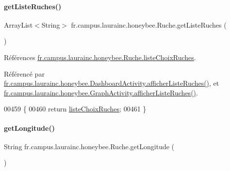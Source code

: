 \paragraph{\texorpdfstring{get\+Liste\+Ruches()}{getListeRuches()}}
{\footnotesize\ttfamily Array\+List$<$String$>$ fr.\+campus.\+laurainc.\+honeybee.\+Ruche.\+get\+Liste\+Ruches (\begin{DoxyParamCaption}{ }\end{DoxyParamCaption})}



Références \hyperlink{classfr_1_1campus_1_1laurainc_1_1honeybee_1_1_ruche_accb6ae9a3a546857525f0e1cdc023250}{fr.\+campus.\+laurainc.\+honeybee.\+Ruche.\+liste\+Choix\+Ruches}.



Référencé par \hyperlink{classfr_1_1campus_1_1laurainc_1_1honeybee_1_1_dashboard_activity_aeb7cdaf69c379e2b070e290130199543}{fr.\+campus.\+laurainc.\+honeybee.\+Dashboard\+Activity.\+afficher\+Liste\+Ruches()}, et \hyperlink{classfr_1_1campus_1_1laurainc_1_1honeybee_1_1_graph_activity_a9e7c089cbecac26d4251fa5310038107}{fr.\+campus.\+laurainc.\+honeybee.\+Graph\+Activity.\+afficher\+Liste\+Ruches()}.


\begin{DoxyCode}
00459                                               \{
00460         \textcolor{keywordflow}{return} \hyperlink{classfr_1_1campus_1_1laurainc_1_1honeybee_1_1_ruche_accb6ae9a3a546857525f0e1cdc023250}{listeChoixRuches};
00461     \}
\end{DoxyCode}
\mbox{\label{classfr_1_1campus_1_1laurainc_1_1honeybee_1_1_ruche_a45b3656e287e168f17fdd1b9ec5fbca1}} 
\paragraph{\texorpdfstring{get\+Longitude()}{getLongitude()}}
{\footnotesize\ttfamily String fr.\+campus.\+laurainc.\+honeybee.\+Ruche.\+get\+Longitude (\begin{DoxyParamCaption}{ }\end{DoxyParamCaption})}




